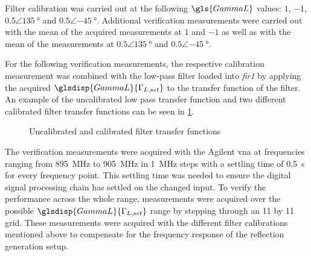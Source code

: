 \documentclass[12pt,a4paper,parskip=full,abstract=true,BCOR=12mm]{scrreprt}
\providecommand{\abs}[1]{\lvert#1\rvert}
\def\device#1{\mbox{\textit{#1}}}
\begin{document}
Filter calibration was carried out at the following $\gls{GammaL}$
values: $1$, $-1$, $0.5\angle\SI{135}{\degree}$ and $0.5\angle\SI{-45}{\degree}$. Additional
verification measurements were carried out with the mean of the acquired measurements
at $1$ and $-1$ as well as with the mean of the measurements at $0.5\angle\SI{135}{\degree}$
and $0.5\angle\SI{-45}{\degree}$.

For the following verification measurements, the respective calibration measurement
was combined with the low-pass filter loaded into \device{fir1} by applying the acquired $\glsdisp{GammaL}{\Gamma_{L,set}}$
to the transfer function of the filter. An example of the uncalibrated low pass
transfer function and two different calibrated filter transfer functions can be
seen in \cref{fig:filter}.

\begin{figure}[htb]
    \centering
    \caption{Uncalibrated and calibrated filter transfer functions}
    \label{fig:filter}
\end{figure}

The verification measurements were acquired with the Agilent \gls{vna} at frequencies
ranging from \SI{895}{\mega\hertz} to \SI{905}{\mega\hertz} in \SI{1}{\mega\hertz} steps
with a settling time of \SI{0.5}{\second} for every frequency point. This settling time
was needed to ensure the digital signal processing chain has settled on the changed input.
To verify the performance across the whole range, measurements were acquired over the possible
$\glsdisp{GammaL}{\Gamma_{L,set}}$ range by stepping through an 11 by 11 grid. These measurements were
acquired with the different filter calibrations mentioned above to compensate for the
frequency response of the reflection generation setup.
\end{document}
